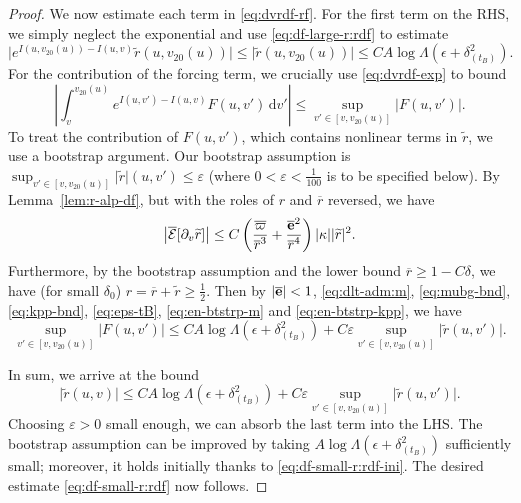 \documentclass[10pt, reqno]{amsart}
\theoremstyle{definition}
\theoremstyle{remark}
\theoremstyle{conjecture}
\numberwithin{equation}{section}
\newcommand{\abs}[1]{\vert#1\vert}
\newcommand{\ud}{\mathrm{d}}
\newcommand{\rd}{\partial}
\newcommand{\0}{\emptyset}
\newcommand{\dlt}{\delta}
\newcommand{\eps}{\epsilon}
\newcommand{\veps}{\varepsilon}
\newcommand{\kpp}{\kappa}
\newcommand{\Lmb}{\Lambda}
\newcommand{\bfe}{{\bf e}}
\newcommand{\calE}{\mathcal E}
\newcommand{\e}{\bfe}							%
\newcommand{\rbg}{\overline{r}}					%
\newcommand{\varpibg}{\overline{\varpi}}				%
\newcommand{\ebg}{\overline{\e}}					%
\newcommand{\rdf}{\widetilde{r}}					%
\newcommand{\Abs}[1]{\left\vert #1 \right\vert}
\begin{document}
\begin{proof}
We now estimate each term in \eqref{eq:dvrdf-rf}. For the first term on the RHS, we simply neglect the exponential and use \eqref{eq:df-large-r:rdf} to estimate
\begin{equation} \label{eq:df-small-r:rdf-ini}
\abs{e^{I(u, v_{20}(u)) - I(u, v)} \rdf(u, v_{20}(u))} \leq \abs{\rdf(u, v_{20}(u))} \leq C A \log \Lmb (\eps + \dlt_{(t_{B})}^{2}).
\end{equation}
For the contribution of the forcing term, we crucially use \eqref{eq:dvrdf-exp} to bound
\begin{equation*}
\Abs{\int_{v}^{v_{20}(u)} e^{I(u, v') - I(u, v)} F(u, v') \, \ud v'}
\leq \sup_{v' \in [v, v_{20}(u)]} \abs{F(u, v')}.
\end{equation*}
To treat the contribution of $F(u, v')$, which contains nonlinear terms in $\rdf$, we use a bootstrap argument. Our bootstrap assumption is $\sup_{v' \in [v, v_{20}(u)]} \abs{\rdf}(u, v') \leq \veps$ (where $0 < \veps < \frac{1}{100}$ is to be specified below). By Lemma~\ref{lem:r-alp-df}, but with the roles of $r$ and $\rbg$ reversed, we have
\begin{equation*}
	\Abs{\overline{\calE}[\rd_{v} \rdf]} \leq C \left( \frac{\varpibg}{\rbg^{3}} + \frac{\ebg^{2}}{\rbg^{4}} \right) \abs{\kpp} \abs{\rdf}^{2}.
\end{equation*}
Furthermore, by the bootstrap assumption and the lower bound $\rbg \geq 1- C \dlt$, we have (for small $\dlt_{0}$) $r = \rbg + \rdf \geq \frac{1}{2}$.
Then by $\abs{\ebg} < 1$, \eqref{eq:dlt-adm:m}, \eqref{eq:mubg-bnd}, \eqref{eq:kpp-bnd}, \eqref{eq:eps-tB}, \eqref{eq:en-btstrp-m} and \eqref{eq:en-btstrp-kpp}, we have
\begin{equation*}
\sup_{v' \in [v, v_{20}(u)]} \abs{F(u, v')} \leq C A \log \Lmb \left( \eps + \dlt_{(t_{B})}^{2} \right) + C \veps \sup_{v' \in [v, v_{20}(u)]} \abs{\rdf(u, v')}.
\end{equation*}

In sum, we arrive at the bound
\begin{equation*}
	\abs{\rdf(u, v)}
	\leq C A \log \Lmb \left( \eps + \dlt_{(t_{B})}^{2} \right) + C \veps \sup_{v' \in [v, v_{20}(u)]} \abs{\rdf(u, v')}.
\end{equation*}
Choosing $\veps > 0$ small enough, we can absorb the last term into the LHS. The bootstrap assumption can be improved by taking $A \log \Lmb (\eps + \dlt_{(t_{B})}^{2})$ sufficiently small; moreover, it holds initially thanks to \eqref{eq:df-small-r:rdf-ini}. The desired estimate \eqref{eq:df-small-r:rdf} now follows. 


\end{proof}
\end{document}
